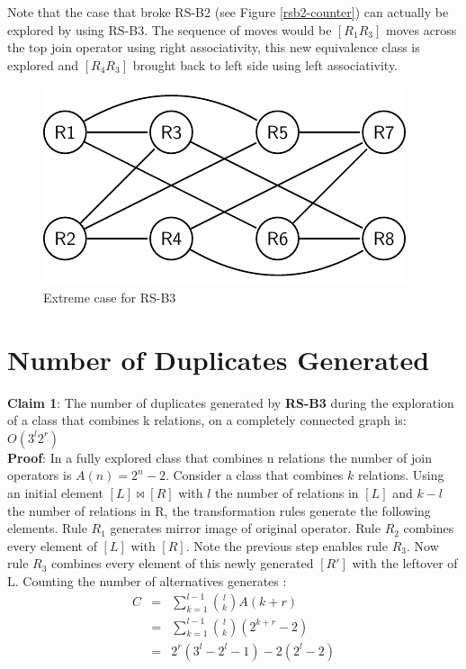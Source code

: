 Note that the case that broke RS-B2 (see Figure \ref{rsb2-counter}) can actually be explored by using RS-B3. The sequence of moves would be $[R_{1}R_{3}]$ moves across the top join operator using right associativity, this new equivalence class is explored and $[R_{4}R_{3}]$ brought back to left side using left associativity. 

\begin{figure}[here]
\begin{center}
\includegraphics{Figures/extreme.pdf}
\end{center}
\caption{Extreme case for RS-B3}
\label{fig:extreme}
\end{figure}

\section{Number of Duplicates Generated}
\textbf{Claim 1}: The number of duplicates generated by \textbf{RS-B3} during the exploration of a class that combines k relations, on a completely connected graph is: $O(3^l2^r)$ \\
\textbf{Proof}: In a fully explored class that combines n relations the number of join operators is $A(n) = 2^n - 2$. Consider a class that combines $k$ relations. Using an initial element $[L]\bowtie[R]$ with $l$ the number of relations in $[L]$ and $k-l$ the number of relations in R, the transformation rules generate the following elements. Rule $R_{1}$ generates mirror image of original operator. Rule $R_{2}$ combines every element of $[L]$ with $[R]$. Note the previous step enables rule $R_{3}$. Now rule $R_{3}$ combines every element of this newly generated $[R']$ with the leftover of L. Counting the number of alternatives generates :
\begin{eqnarray*}
C &=& \sum\limits_{k=1}^{l-1} {l \choose k} A(k+r) \nonumber \\ 
 &=& \sum\limits_{k=1}^{l-1} {l \choose k} (2^{k+r} - 2) \nonumber \\
 &=& 2^r (3^l - 2^l - 1) - 2 (2^l - 2) \nonumber \\
\end{eqnarray*}

